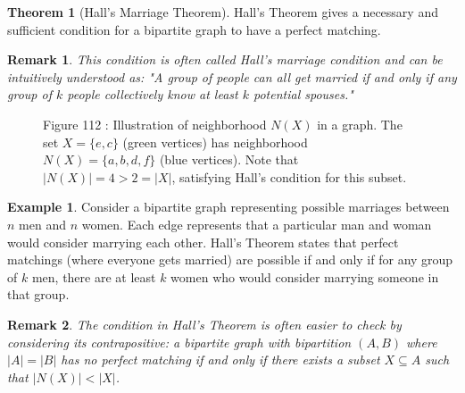 \documentclass{article}
\newtheorem{remark}{Remark}
\theoremstyle{definition}
\newtheorem{example}{Example}
\newtheorem{theorem}{Theorem}
\begin{document}
\begin{theorem}[Hall's Marriage Theorem]
Hall's Theorem gives a necessary and sufficient condition for a bipartite graph to have a perfect matching.
\end{theorem}

\begin{remark}
This condition is often called \emph{Hall's marriage condition} and can be intuitively understood as: "A group of people can all get married if and only if any group of $k$ people collectively know at least $k$ potential spouses."
\end{remark}

\begin{figure}[h]
\centering
{}

\small Figure 112 : {Illustration of neighborhood $N(X)$ in a graph. The set $X = \{e, c\}$ (green vertices) has neighborhood $N(X) = \{a, b, d, f\}$ (blue vertices). Note that $|N(X)| = 4 > 2 = |X|$, satisfying Hall's condition for this subset.}
\end{figure}

\begin{example}
Consider a bipartite graph representing possible marriages between $n$ men and $n$ women. Each edge represents that a particular man and woman would consider marrying each other. Hall's Theorem states that perfect matchings (where everyone gets married) are possible if and only if for any group of $k$ men, there are at least $k$ women who would consider marrying someone in that group.
\end{example}

\begin{remark}
The condition in Hall's Theorem is often easier to check by considering its contrapositive: a bipartite graph with bipartition $(A,B)$ where $|A| = |B|$ has no perfect matching if and only if there exists a subset $X \subseteq A$ such that $|N(X)| < |X|$.
\end{remark}
\end{document}
